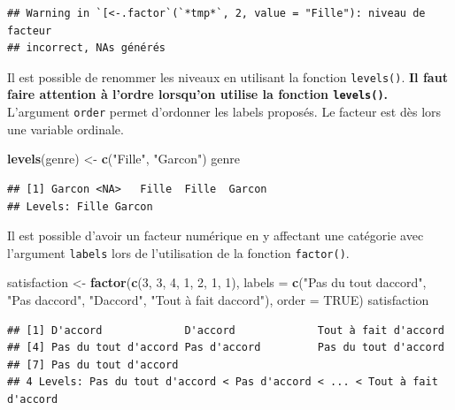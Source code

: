 \documentclass[
]{book}
\newenvironment{Shaded}{\begin{snugshade}}{\end{snugshade}}
\newcommand{\AttributeTok}[1]{\textcolor[rgb]{0.13,0.29,0.53}{#1}}
\newcommand{\ConstantTok}[1]{\textcolor[rgb]{0.56,0.35,0.01}{#1}}
\newcommand{\DecValTok}[1]{\textcolor[rgb]{0.00,0.00,0.81}{#1}}
\newcommand{\FunctionTok}[1]{\textcolor[rgb]{0.13,0.29,0.53}{\textbf{#1}}}
\newcommand{\NormalTok}[1]{#1}
\newcommand{\OtherTok}[1]{\textcolor[rgb]{0.56,0.35,0.01}{#1}}
\newcommand{\StringTok}[1]{\textcolor[rgb]{0.31,0.60,0.02}{#1}}
\begin{document}
\begin{verbatim}
## Warning in `[<-.factor`(`*tmp*`, 2, value = "Fille"): niveau de facteur
## incorrect, NAs générés
\end{verbatim}

Il est possible de renommer les niveaux en utilisant la fonction \texttt{levels()}. \textbf{Il faut faire attention à l'ordre lorsqu'on utilise la fonction \texttt{levels()}.} L'argument \texttt{order} permet d'ordonner les labels proposés. Le facteur est dès lors une variable ordinale.

\begin{Shaded}
\begin{Highlighting}[]
\FunctionTok{levels}\NormalTok{(genre) }\OtherTok{\textless{}{-}} \FunctionTok{c}\NormalTok{(}\StringTok{"Fille"}\NormalTok{, }\StringTok{"Garcon"}\NormalTok{)}
\NormalTok{genre}
\end{Highlighting}
\end{Shaded}

\begin{verbatim}
## [1] Garcon <NA>   Fille  Fille  Garcon
## Levels: Fille Garcon
\end{verbatim}

Il est possible d'avoir un facteur numérique en y affectant une catégorie avec l'argument \texttt{labels} lors de l'utilisation de la fonction \texttt{factor()}.

\begin{Shaded}
\begin{Highlighting}[]
\NormalTok{satisfaction }\OtherTok{\textless{}{-}} \FunctionTok{factor}\NormalTok{(}\FunctionTok{c}\NormalTok{(}\DecValTok{3}\NormalTok{, }\DecValTok{3}\NormalTok{, }\DecValTok{4}\NormalTok{, }\DecValTok{1}\NormalTok{, }\DecValTok{2}\NormalTok{, }\DecValTok{1}\NormalTok{, }\DecValTok{1}\NormalTok{), }
                       \AttributeTok{labels =} \FunctionTok{c}\NormalTok{(}\StringTok{"Pas du tout d\textquotesingle{}accord"}\NormalTok{, }\StringTok{"Pas d\textquotesingle{}accord"}\NormalTok{, }
                                  \StringTok{"D\textquotesingle{}accord"}\NormalTok{, }\StringTok{"Tout à fait d\textquotesingle{}accord"}\NormalTok{), }
                       \AttributeTok{order =} \ConstantTok{TRUE}\NormalTok{)}
\NormalTok{satisfaction}
\end{Highlighting}
\end{Shaded}

\begin{verbatim}
## [1] D'accord             D'accord             Tout à fait d'accord
## [4] Pas du tout d'accord Pas d'accord         Pas du tout d'accord
## [7] Pas du tout d'accord
## 4 Levels: Pas du tout d'accord < Pas d'accord < ... < Tout à fait d'accord
\end{verbatim}
\end{document}

